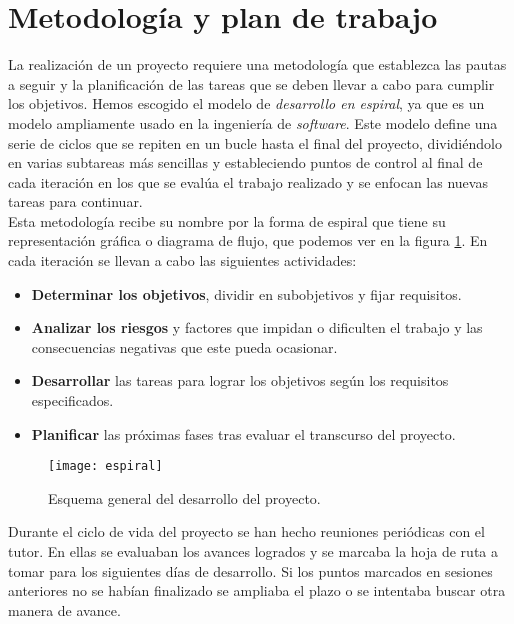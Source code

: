 \section{Metodología y plan de trabajo}

La realización de un proyecto requiere una metodología que establezca las pautas a seguir y la planificación de las tareas que se deben llevar a cabo para cumplir los objetivos. Hemos escogido el modelo de \emph{desarrollo en espiral}, ya que es un modelo ampliamente usado en la ingeniería de \emph{software}. Este modelo define una serie de ciclos que se repiten en un bucle hasta el final del proyecto, dividiéndolo en varias subtareas más sencillas y estableciendo puntos de control al final de cada iteración en los que se evalúa el trabajo realizado y se enfocan las nuevas tareas para continuar.\\

Esta metodología recibe su nombre por la forma de espiral que tiene su representación gráfica o diagrama de flujo, que podemos ver en la figura \ref{fig:planificacion_espiral}. En cada iteración se llevan a cabo las siguientes actividades:

\begin{itemize}
 \item \textbf{Determinar los objetivos}, dividir en subobjetivos y fijar requisitos.
 \item \textbf{Analizar los riesgos} y factores que impidan o dificulten el trabajo y las consecuencias negativas que este
 pueda ocasionar.
 \item \textbf{Desarrollar} las tareas para lograr los objetivos según los requisitos especificados.
 \item \textbf{Planificar} las próximas fases tras evaluar el transcurso del proyecto.
\end{itemize}

\begin{figure}[htb]
\centering
\texttt{[image: espiral]}
\caption{Esquema general del desarrollo del proyecto.}
\label{fig:planificacion_espiral}
\end{figure}

Durante el ciclo de vida del proyecto se han hecho reuniones periódicas con el tutor. En ellas se evaluaban los avances logrados y se marcaba la hoja de ruta a tomar para los siguientes días de desarrollo. Si los puntos marcados en sesiones anteriores no se habían finalizado se ampliaba el plazo o se intentaba buscar otra manera de avance.\\

